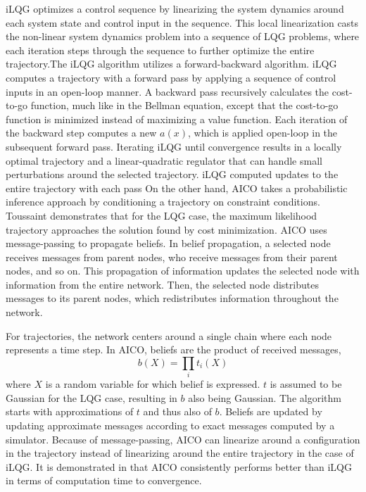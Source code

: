 \documentclass[12pt]{article}
\begin{document}
            iLQG optimizes a control sequence by linearizing the system dynamics around each system state and control input in the sequence. This local linearization casts the non-linear system dynamics problem into a sequence of LQG problems, where each iteration steps through the sequence to further optimize the entire trajectory.The iLQG algorithm utilizes a forward-backward algorithm. iLQG computes a trajectory with a forward pass by applying a sequence of control inputs in an open-loop manner. A backward pass recursively calculates the cost-to-go function, much like in the Bellman equation, except that the cost-to-go function is minimized instead of maximizing a value function. Each iteration of the backward step computes a new $a(x)$, which is applied open-loop in the subsequent forward pass. Iterating iLQG until convergence results in a locally optimal trajectory and a linear-quadratic regulator that can handle small perturbations around the selected trajectory.\cite{todorov_generalized_2005} iLQG computed updates to the entire trajectory with each pass
            On the other hand, AICO takes a probabilistic inference approach by conditioning a trajectory on constraint conditions. Toussaint demonstrates that for the LQG case, the maximum likelihood trajectory approaches the solution found by cost minimization. AICO uses message-passing to propagate beliefs. In belief propagation, a selected node receives messages from parent nodes, who receive messages from their parent nodes, and so on. This propagation of information updates the selected node with information from the entire network. Then, the selected node distributes messages to its parent nodes, which redistributes information throughout the network. \cite{minka_expectation_nodate}
            \par For trajectories, the network centers around a single chain where each node represents a time step. In AICO, beliefs are the product of received messages,
            \begin{equation}
                b(X)=\prod_{i}t_{i}(X)
            \end{equation}
            where $X$ is a random variable for which belief is expressed. $t$ is assumed to be Gaussian for the LQG case, resulting in $b$ also being Gaussian. The algorithm starts with approximations of $t$ and thus also of $b$. Beliefs are updated by updating approximate messages according to exact messages computed by a simulator.
            Because of message-passing, AICO can linearize around a configuration in the trajectory instead of linearizing around the entire trajectory in the case of iLQG.\cite{toussaint_robot_2009} It is demonstrated in \cite{toussaint_robot_2009} that AICO consistently performs better than iLQG in terms of computation time to convergence.
\end{document}
